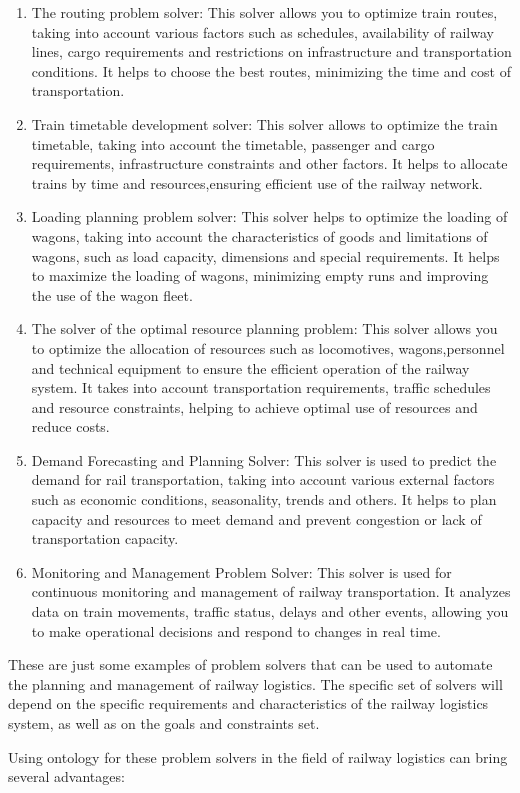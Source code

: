 \documentclass[a4paper]{article}
\begin{document}
\begin{multicols}{2}
\begin{enumerate}[label=\arabic*)]
\itemsep=-1.5mm
\item The routing problem solver: This solver allows
you to optimize train routes, taking into account
various factors such as schedules, availability of
railway lines, cargo requirements and restrictions
on infrastructure and transportation conditions. It
helps to choose the best routes, minimizing the
time and cost of transportation.
\item Train timetable development solver: This solver
allows to optimize the train timetable, taking into
account the timetable, passenger and cargo requirements, infrastructure constraints and other factors. It helps to allocate trains by time and resources,ensuring efficient use of the railway network.
\item Loading planning problem solver: This solver helps
to optimize the loading of wagons, taking into
account the characteristics of goods and limitations
of wagons, such as load capacity, dimensions and
special requirements. It helps to maximize the
loading of wagons, minimizing empty runs and
improving the use of the wagon fleet.
\item The solver of the optimal resource planning problem: This solver allows you to optimize the allocation of resources such as locomotives, wagons,personnel and technical equipment to ensure the efficient operation of the railway system. It takes into
account transportation requirements, traffic schedules and resource constraints, helping to achieve
optimal use of resources and reduce costs.
 \item Demand Forecasting and Planning Solver: This
solver is used to predict the demand for rail
transportation, taking into account various external
factors such as economic conditions, seasonality,
trends and others. It helps to plan capacity and
resources to meet demand and prevent congestion
or lack of transportation capacity.
\item Monitoring and Management Problem Solver: This
solver is used for continuous monitoring and management of railway transportation. It analyzes data
on train movements, traffic status, delays and other
events, allowing you to make operational decisions
and respond to changes in real time.
\end{enumerate} 
\par These are just some examples of problem solvers that
can be used to automate the planning and management of
railway logistics. The specific set of solvers will depend
on the specific requirements and characteristics of the
railway logistics system, as well as on the goals and
constraints set.
\par Using ontology for these problem solvers in the field
of railway logistics can bring several advantages:


\end{multicols}
\end{document}
